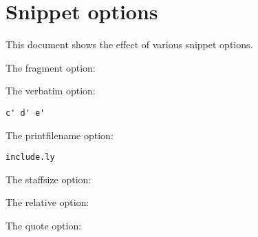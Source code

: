 \documentclass[a4paper, 12pt]{article}
\begin{document}
\section{Snippet options}

This document shows the effect of various snippet options.

The fragment option:

{%
\parindent 0pt
\noindent
\ifx\preLilyPondExample \undefined
\else
  \expandafter\preLilyPondExample
\fi
\def\lilypondbook{}%

\ifx\postLilyPondExample \undefined
\else
  \expandafter\postLilyPondExample
\fi
}

The verbatim option:

\noindent
\begin{verbatim}
c' d' e'
\end{verbatim}
{%
\parindent 0pt
\noindent
\ifx\preLilyPondExample \undefined
\else
  \expandafter\preLilyPondExample
\fi
\def\lilypondbook{}%

\ifx\postLilyPondExample \undefined
\else
  \expandafter\postLilyPondExample
\fi
}

The printfilename option:

\texttt{include.ly}
\linebreak
{%
\parindent 0pt
\noindent
\ifx\preLilyPondExample \undefined
\else
  \expandafter\preLilyPondExample
\fi
\def\lilypondbook{}%

\ifx\postLilyPondExample \undefined
\else
  \expandafter\postLilyPondExample
\fi
}

The staffsize option:

{%
\parindent 0pt
\noindent
\ifx\preLilyPondExample \undefined
\else
  \expandafter\preLilyPondExample
\fi
\def\lilypondbook{}%

\ifx\postLilyPondExample \undefined
\else
  \expandafter\postLilyPondExample
\fi
}
{%
\parindent 0pt
\noindent
\ifx\preLilyPondExample \undefined
\else
  \expandafter\preLilyPondExample
\fi
\def\lilypondbook{}%

\ifx\postLilyPondExample \undefined
\else
  \expandafter\postLilyPondExample
\fi
}

The relative option:

{%
\parindent 0pt
\noindent
\ifx\preLilyPondExample \undefined
\else
  \expandafter\preLilyPondExample
\fi
\def\lilypondbook{}%

\ifx\postLilyPondExample \undefined
\else
  \expandafter\postLilyPondExample
\fi
}

The quote option:

\begin{quote}
{%
\parindent 0pt
\noindent
\ifx\preLilyPondExample \undefined
\else
  \expandafter\preLilyPondExample
\fi
\def\lilypondbook{}%

\ifx\postLilyPondExample \undefined
\else
  \expandafter\postLilyPondExample
\fi
}
\end{quote}
\end{document}
